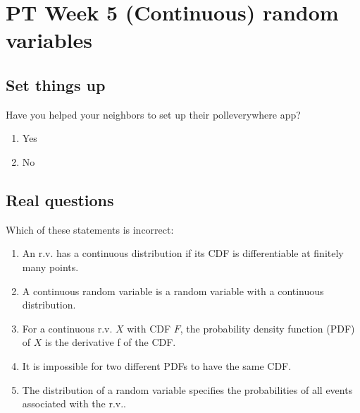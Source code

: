 \documentclass[poll_tutorial_format]{subfiles}
\begin{document}
	\maketitle
	
	\setcounter{section}{4}
	\section{PT Week 5 (Continuous) random variables}
	
	\subsection{Set things up}
	\label{sec:set-things-up}
	
	
	
	\setcounter{theorem}{-1}
	\begin{exercise}
		Have you helped your neighbors to set up their polleverywhere app? 
		\begin{enumerate}
			\item Yes
			\item No
		\end{enumerate}
	\end{exercise}
	
	\subsection{Real questions}
	\label{sec:start-real-questions pt week 5}
	
		
	
 
	
	
	\begin{exercise}
		Which of these statements is incorrect: 
		\begin{enumerate}
			\item An r.v. has a continuous distribution if its CDF is differentiable at finitely many points. 
			\item A continuous random variable is a random variable with a continuous distribution.  
			\item For a continuous r.v. $X$ with CDF
			$F$, the probability density function (PDF) of $X$ is the derivative f of the CDF.
			\item It is impossible for two different PDFs to have the same CDF.
			\item The distribution of a random variable specifies the probabilities of all events associated with the r.v..
		\end{enumerate}
	\end{exercise}
	
\end{document}
